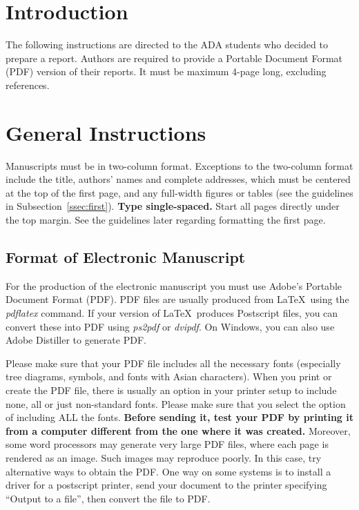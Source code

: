 \documentclass[11pt]{article}
\begin{document}
\section{Introduction}

The following instructions are directed to the ADA students who decided to prepare a report. Authors are
required to provide a Portable Document Format (PDF) version of their
reports. It must be maximum 4-page long, excluding references.

\section{General Instructions}

Manuscripts must be in two-column format.  Exceptions to the
two-column format include the title, authors' names and complete
addresses, which must be centered at the top of the first page, and
any full-width figures or tables (see the guidelines in
Subsection~\ref{ssec:first}). {\bf Type single-spaced.}  Start all
pages directly under the top margin. See the guidelines later
regarding formatting the first page.

\subsection{Format of Electronic Manuscript}
\label{sect:pdf}

For the production of the electronic manuscript you must use Adobe's
Portable Document Format (PDF). PDF files are usually produced from
\LaTeX\ using the \textit{pdflatex} command. If your version of
\LaTeX\ produces Postscript files, you can convert these into PDF
using \textit{ps2pdf} or \textit{dvipdf}. On Windows, you can also use
Adobe Distiller to generate PDF.

Please make sure that your PDF file includes all the necessary fonts
(especially tree diagrams, symbols, and fonts with Asian
characters). When you print or create the PDF file, there is usually
an option in your printer setup to include none, all or just
non-standard fonts.  Please make sure that you select the option of
including ALL the fonts. \textbf{Before sending it, test your PDF by
  printing it from a computer different from the one where it was
  created.} Moreover, some word processors may generate very large PDF
files, where each page is rendered as an image. Such images may
reproduce poorly. In this case, try alternative ways to obtain the
PDF. One way on some systems is to install a driver for a postscript
printer, send your document to the printer specifying ``Output to a
file'', then convert the file to PDF.
\end{document}
